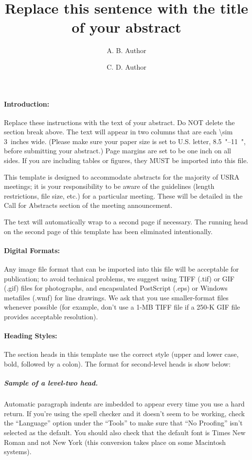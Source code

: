 \documentclass{lpsc_abstract}
\title{Replace this sentence with the title of your abstract}
\author[1]{A. B. Author}
\author[2]{C. D. Author}
\affil[1]{Affiliation (include full mailing address and e-mail address if desired) for first author}
\affil[2]{Affiliation for second author (full mailing address and e-mail address)}
\begin{document}
\maketitle    %

\paragraph{Introduction:}
Replace these instructions with the text of your abstract.
Do NOT delete the section break above.
The text will appear in two columns that are each \SI{\sim 3}{inches} wide.
(Please make sure your paper size is set to U.S. letter, \SIrange[range-phrase=$\times$]{8.5}{11}{"}, before submitting your abstract.)
Page margins are set to be one inch on all sides.
If you are including tables or figures, they MUST be imported into this file.

This template is designed to accommodate abstracts for the majority of USRA meetings; it is your responsibility to be aware of the guidelines (length restrictions, file size, etc.) for a particular meeting. These will be detailed in the Call for Abstracts section of the meeting announcement.

The text will automatically wrap to a second page if necessary. The running head on the second page of this template has been eliminated intentionally.

\paragraph{Digital Formats:}
Any image file format that can be imported into this file will be acceptable for publication; to avoid technical problems, we suggest using TIFF (.tif) or GIF (.gif) files for photographs, and encapsulated PostScript (.eps) or Windows metafiles (.wmf) for line drawings.
We ask that you use smaller-format files whenever possible (for example, don’t use a 1-MB TIFF file if a 250-K GIF file provides acceptable resolution).

\paragraph{Heading Styles:}
The section heads in this template use the correct style (upper and lower case, bold, followed by a colon). The format for second-level heads is show below:

\subparagraph{Sample of a level-two head.}
Automatic paragraph indents are imbedded to appear every time you use a hard return. If you’re using the spell checker and it doesn’t seem to be working, check the “Language” option under the “Tools” to make sure that “No Proofing” isn’t selected as the default. You should also check that the default font is Times New Roman and not New York (this conversion takes place on some Macintosh systems).
\end{document}
